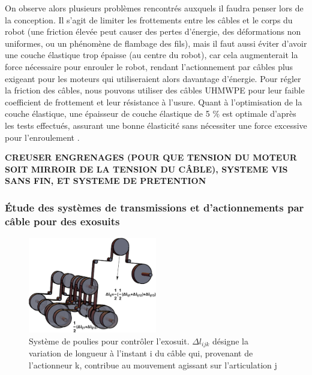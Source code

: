 \documentclass[a4paper, 11pt]{report}
\begin{document}
            On observe alors plusieurs problèmes rencontrés auxquels il faudra penser lors de la conception. Il s'agit de limiter les frottements entre les câbles et le corps du robot (une friction élevée peut causer des pertes d'énergie, des déformations non uniformes, ou un phénomène de flambage des fils), mais il faut aussi éviter d'avoir une couche élastique trop épaisse (au centre du robot), car cela augmenterait la force nécessaire pour enrouler le robot, rendant l'actionnement par câbles plus exigeant pour les moteurs qui utiliseraient alors davantage d'énergie. Pour régler la friction des câbles, nous pouvons utiliser des câbles UHMWPE pour leur faible coefficient de frottement et leur résistance à l'usure. Quant à l'optimisation de la couche élastique, une épaisseur de couche élastique de 5 $\%$ est optimale d'après les tests effectués, assurant une bonne élasticité sans nécessiter une force excessive pour l'enroulement \cite{wang_spirobs_2025}.

            \textbf{CREUSER ENGRENAGES (POUR QUE TENSION DU MOTEUR SOIT MIRROIR DE LA TENSION DU CÂBLE), SYSTEME VIS SANS FIN, ET SYSTEME DE PRETENTION}

        \subsubsection{Étude des systèmes de transmissions et d'actionnements par câble pour des exosuits}

            \begin{figure}
                \centering
                \includegraphics[width=0.5\textwidth]{Figures/poulies.jpg}
                \caption{Système de poulies pour contrôler l'exosuit. $\Delta l_{ijk}$ désigne la variation de longueur à l'instant i du câble qui, provenant de l'actionneur k, contribue au mouvement agissant sur l'articulation j \cite{daniel_rodriguez-jorge_transmission_2023}}
                \label{fig:poulies}
            \end{figure}
\end{document}
